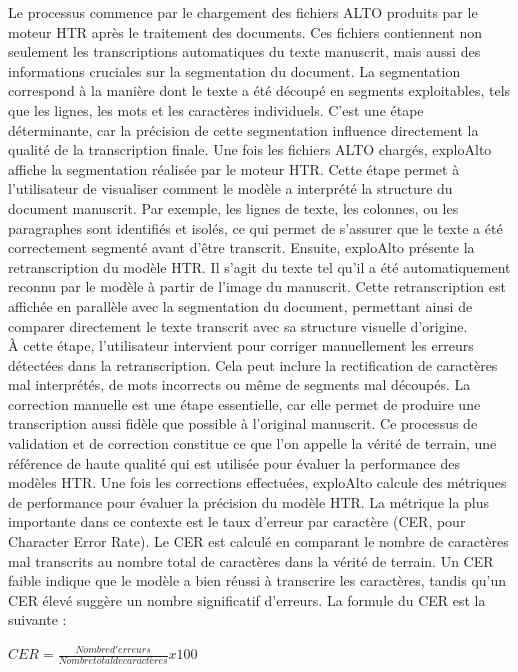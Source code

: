 \documentclass[a4paper,12pt,twoside]{book}
\begin{document}
	Le processus commence par le chargement des fichiers ALTO produits par le moteur HTR après le traitement des documents. Ces fichiers contiennent non seulement les transcriptions automatiques du texte manuscrit, mais aussi des informations cruciales sur la segmentation du document. La segmentation correspond à la manière dont le texte a été découpé en segments exploitables, tels que les lignes, les mots et les caractères individuels. C’est une étape déterminante, car la précision de cette segmentation influence directement la qualité de la transcription finale. Une fois les fichiers ALTO chargés, exploAlto affiche la segmentation réalisée par le moteur HTR. Cette étape permet à l’utilisateur de visualiser comment le modèle a interprété la structure du document manuscrit. Par exemple, les lignes de texte, les colonnes, ou les paragraphes sont identifiés et isolés, ce qui permet de s’assurer que le texte a été correctement segmenté avant d’être transcrit. Ensuite, exploAlto présente la retranscription du modèle HTR. Il s’agit du texte tel qu’il a été automatiquement reconnu par le modèle à partir de l’image du manuscrit. Cette retranscription est affichée en parallèle avec la segmentation du document, permettant ainsi de comparer directement le texte transcrit avec sa structure visuelle d’origine.
	\\
	
	À cette étape, l’utilisateur intervient pour corriger manuellement les erreurs détectées dans la retranscription. Cela peut inclure la rectification de caractères mal interprétés, de mots incorrects ou même de segments mal découpés. La correction manuelle est une étape essentielle, car elle permet de produire une transcription aussi fidèle que possible à l’original manuscrit. Ce processus de validation et de correction constitue ce que l’on appelle la vérité de terrain, une référence de haute qualité qui est utilisée pour évaluer la performance des modèles HTR. 
	Une fois les corrections effectuées, exploAlto calcule des métriques de performance pour évaluer la précision du modèle HTR. La métrique la plus importante dans ce contexte est le taux d’erreur par caractère (CER, pour Character Error Rate). Le CER est calculé en comparant le nombre de caractères mal transcrits au nombre total de caractères dans la vérité de terrain. Un CER faible indique que le modèle a bien réussi à transcrire les caractères, tandis qu’un CER élevé suggère un nombre significatif d’erreurs. La formule du CER est la suivante :
	
	\begin{center}
			$ CER = \frac{Nombre d'erreurs}{Nombre total de caractères} x 100 $
	\end{center}
\end{document}
